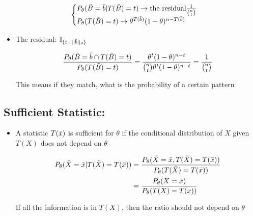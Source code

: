 \documentclass[11pt,letterpaper,titlepage]{article}
\begin{document}
\begin{itemize}
    \begin{gather*}
        \begin{cases}
            P_{\theta}(\Bar{B} = \Bar{b} | T(\Bar{B}) = t) \rightarrow \text{the residual} \frac{1}{{n \choose t}} \\
            P_{\theta}(T(\Bar{B}) = t) \rightarrow \theta^{T(\Bar{b})}(1-\theta)^{n - T(\Bar{b})}
        \end{cases}
    \end{gather*}
    
    \item The residual: $\mathbb{I}_{\{t = ||\Bar{b}||_0\}}$
    
    \begin{equation*}
        \frac{P_{\theta}(\Bar{B} = \Bar{b} \cap T(\Bar{B}) = t)}{P_{\theta}(T(\Bar{B}) = t)} = \frac{\theta^{t}(1 - \theta)^{n - t}}{{n \choose t} \theta^{t}(1 - \theta)^{n - t}} = \frac{1}{{n \choose t}}
    \end{equation*}
    
    This means if they match, what is the probability of a certain pattern
    
\end{itemize}

\subsection{Sufficient Statistic:}

\begin{itemize}
    
    \item A statistic $T(\Bar{x})$ is sufficient for $\theta$ if the conditional distribution of $X$ given $T(X)$ does not depend on $\theta$
    
    \begin{equation*}
        \begin{aligned}
            P_{\theta}(\Bar{X} = \Bar{x} | T(\Bar{X}) = T(\Bar{x})) &= \frac{P_{\theta}(\Bar{X} = \Bar{x}, T(\Bar{X}) = T(\Bar{x}))}{P_{\theta}(T(\Bar{X}) = T(\Bar{x}))} \\
            &= \frac{P_{\theta}(\Bar{X} = \Bar{x})}{P_{\theta}(T(X) = T(x))}
        \end{aligned}
    \end{equation*}
    
    If all the information is in $T(X)$, then the ratio should not depend on $\theta$
    
\end{itemize}
\end{document}
